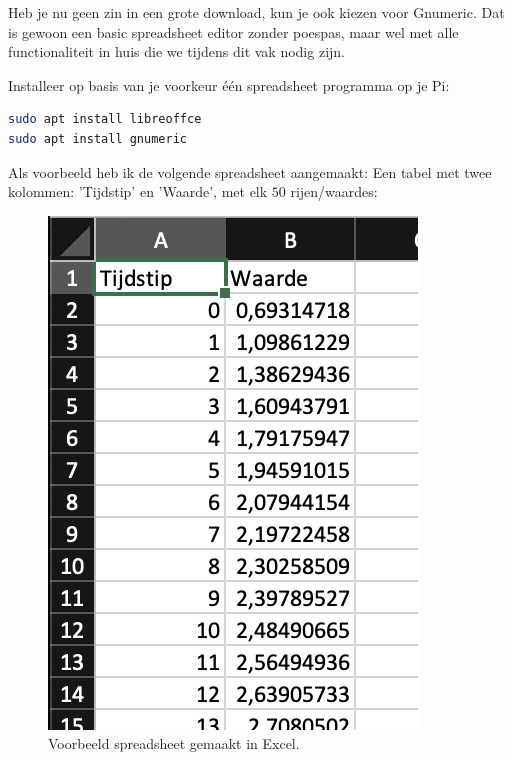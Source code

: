 Heb je nu geen zin in een grote download, kun je ook kiezen voor Gnumeric. Dat is gewoon een basic spreadsheet editor zonder poespas, maar wel met alle functionaliteit in huis die we tijdens dit vak nodig zijn.

\begin{exercise}
Installeer op basis van je voorkeur één spreadsheet programma op je Pi:
\begin{lstlisting}[language=bash]
sudo apt install libreoffce
sudo apt install gnumeric
\end{lstlisting}
\vspace{-5mm}
\end{exercise}

Als voorbeeld heb ik de volgende spreadsheet aangemaakt: Een tabel met twee kolommen: 'Tijdstip' en 'Waarde', met elk $50$ rijen/waardes: 
\begin{figure}[!ht]
\centering\includegraphics[scale=0.5]{Pictures/chapter07/excel1.png}
\caption{Voorbeeld spreadsheet gemaakt in Excel.}
\label{fig:excel1} %
\end{figure}

\newpage

